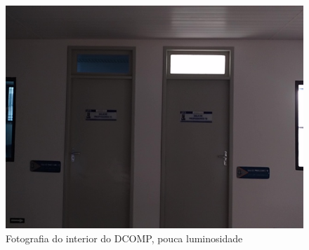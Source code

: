 \begin{figure}[!htb]
	\centering
		\includegraphics[width= \textwidth]{Imagens/figura4-18.jpg}
	\caption{Fotografia do interior do DCOMP, pouca luminosidade}
	\label{fig4:18}
\end{figure}